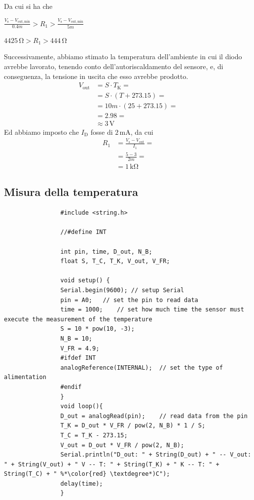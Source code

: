 \documentclass[a4paper]{article}
\begin{document}
			\newline
			Da cui si ha che
			\newline
			\begin{center}
				$ \frac{V_{\mathrm{s}} - V_{\mathrm{out, min}}}{0.4m} > R_{1} > \frac{V_{\mathrm{s}} - V_{\mathrm{out, min}}}{5m} $
			\end{center}
			\newline
			\begin{center}
				$ 4425 \, \mathrm{\Omega} > R_{1} > 444 \, \mathrm{\Omega} $
			\end{center}
			Successivamente, abbiamo stimato la temperatura dell'ambiente in cui il diodo avrebbe lavorato, tenendo conto dell'autoriscaldamento del sensore, e, di conseguenza, la tensione in uscita che esso avrebbe prodotto.
			\begin{equation*}
				\begin{split}
					V_{\mathrm{out}} &= S \cdot T_{\mathrm{K}} = \\
									 &= S \cdot (T + 273.15) = \\
									 &= 10m \cdot (25 + 273.15) = \\
									 &= 2.98 = \\
									 &\approx 3 \, \mathrm{V}
				\end{split}
			\end{equation*}
			Ed abbiamo imposto che $ I_{\mathrm{D}} $ fosse di $ 2 \, \mathrm{mA} $, da cui
			\begin{equation*}
				\begin{split}
					R_{1} &= \frac{V_{\mathrm{s}} - V_{\mathrm{out}}}{I_{1}} = \\
						  &= \frac{5 - 3}{2m} = \\
						  &= 1 \, \mathrm{k\Omega}
				\end{split}
			\end{equation*}
		\subsection{Misura della temperatura}
			\begin{lstlisting}
				#include <string.h>
				
				//#define INT
				
				int pin, time, D_out, N_B;
				float S, T_C, T_K, V_out, V_FR;
				
				void setup() {
				Serial.begin(9600);	// setup Serial
				pin = A0;	// set the pin to read data
				time = 1000;	// set how much time the sensor must execute the measurement of the temperature
				S = 10 * pow(10, -3);
				N_B = 10;
				V_FR = 4.9;
				#ifdef INT
				analogReference(INTERNAL);	// set the type of alimentation
				#endif
				}
				void loop(){
				D_out = analogRead(pin);	// read data from the pin
				T_K = D_out * V_FR / pow(2, N_B) * 1 / S;
				T_C = T_K - 273.15;
				V_out = D_out * V_FR / pow(2, N_B);
				Serial.println("D_out: " + String(D_out) + " -- V_out: " + String(V_out) + " V -- T: " + String(T_K) + " K -- T: " + String(T_C) + " %*\color{red} \textdegree*)C");
				delay(time);
				}
			\end{lstlisting}
\end{document}
